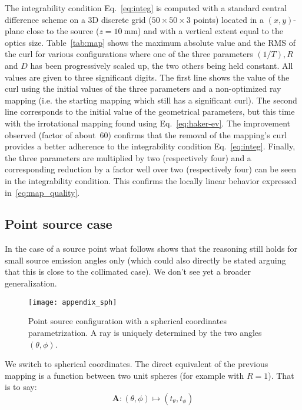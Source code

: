 The integrability condition Eq.~\eqref{eq:integ} is computed with a
standard central difference scheme on a 3D discrete grid ($50\times 50
\times 3$ points) located in a $(x,y)$-plane close to the source
($z=10\mathrm{~mm}$) and with a vertical extent equal to the optics
size. Table~\ref{tab:map} shows the maximum absolute value and the RMS
of the curl for various configurations where one of the three parameters
$(1/T), R$ and $D$ has been progressively scaled up, the two others being 
held constant. All values are
given to three significant digits. The first line shows the value of
the curl using the initial values of the three parameters and a
non-optimized ray mapping (i.e. the starting mapping which still has a
significant curl). The second line corresponds to the initial value of
the geometrical parameters, but this time with the irrotational
mapping found using Eq.~\ref{eq:haker-ev}.  The improvement observed
(factor of about~60) confirms that the removal of the mapping's curl
provides a better adherence to the integrability condition
Eq.~\eqref{eq:integ}.  Finally, the three parameters are multiplied by
two (respectively four) and a corresponding reduction by a factor well
over two (respectively four) can be seen in the integrability
condition. This confirms the locally linear behavior expressed
in~\eqref{eq:map_quality}.


\subsection{Point source case}

In the case of a source point what follows shows that the reasoning still holds for  
small source emission angles only (which could also directly be stated
arguing  that this is close to the collimated case).
We don't see yet a broader generalization.

\begin{figure}[!htbp]
  \centering \texttt{[image: appendix\_sph]}
  \caption{Point source configuration with a spherical
  coordinates parametrization. A ray is uniquely determined by the two angles $(\theta, \phi)$.  
  }
  \label{fig:appendix_sph}
\end{figure}


We switch to spherical coordinates.
The direct equivalent of the previous mapping is a function between
 two unit spheres (for example with $R=1$). That
is to say:
\[ \mathbf{A} : (\theta,\phi) \mapsto (t_\theta, t_\phi)\]

